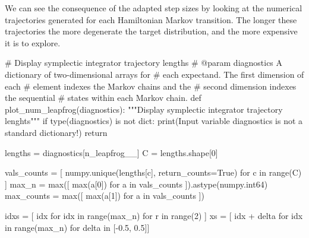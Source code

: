 \documentclass[
  letterpaper,
  DIV=11,
  numbers=noendperiod]{scrartcl}
\newenvironment{Shaded}{\begin{snugshade}}{\end{snugshade}}
\newcommand{\BuiltInTok}[1]{\textcolor[rgb]{0.00,0.23,0.31}{#1}}
\newcommand{\CommentTok}[1]{\textcolor[rgb]{0.37,0.37,0.37}{#1}}
\newcommand{\ControlFlowTok}[1]{\textcolor[rgb]{0.00,0.23,0.31}{#1}}
\newcommand{\DecValTok}[1]{\textcolor[rgb]{0.68,0.00,0.00}{#1}}
\newcommand{\FloatTok}[1]{\textcolor[rgb]{0.68,0.00,0.00}{#1}}
\newcommand{\KeywordTok}[1]{\textcolor[rgb]{0.00,0.23,0.31}{#1}}
\newcommand{\NormalTok}[1]{\textcolor[rgb]{0.00,0.23,0.31}{#1}}
\newcommand{\OperatorTok}[1]{\textcolor[rgb]{0.37,0.37,0.37}{#1}}
\newcommand{\StringTok}[1]{\textcolor[rgb]{0.13,0.47,0.30}{#1}}
\newcommand{\VariableTok}[1]{\textcolor[rgb]{0.07,0.07,0.07}{#1}}
\begin{document}
We can see the consequence of the adapted step sizes by looking at the
numerical trajectories generated for each Hamiltonian Markov transition.
The longer these trajectories the more degenerate the target
distribution, and the more expensive it is to explore.

\begin{Shaded}
\begin{Highlighting}[]
\CommentTok{\# Display symplectic integrator trajectory lengths}
\CommentTok{\# @param diagnostics A dictionary of two{-}dimensional arrays for }
\CommentTok{\#                    each expectand.  The first dimension of each}
\CommentTok{\#                    element indexes the Markov chains and the }
\CommentTok{\#                    second dimension indexes the sequential }
\CommentTok{\#                    states within each Markov chain.}
\KeywordTok{def}\NormalTok{ plot\_num\_leapfrog(diagnostics):}
  \CommentTok{"""Display symplectic integrator trajectory lenghts"""}
  \ControlFlowTok{if} \BuiltInTok{type}\NormalTok{(diagnostics) }\KeywordTok{is} \KeywordTok{not} \BuiltInTok{dict}\NormalTok{:}
    \BuiltInTok{print}\NormalTok{(}\StringTok{\textquotesingle{}Input variable \textasciigrave{}diagnostics\textasciigrave{} is not a standard dictionary!\textquotesingle{}}\NormalTok{)}
    \ControlFlowTok{return}
  
\NormalTok{  lengths }\OperatorTok{=}\NormalTok{ diagnostics[}\StringTok{\textquotesingle{}n\_leapfrog\_\_\textquotesingle{}}\NormalTok{]}
\NormalTok{  C }\OperatorTok{=}\NormalTok{ lengths.shape[}\DecValTok{0}\NormalTok{]}
  
\NormalTok{  vals\_counts }\OperatorTok{=}\NormalTok{ [ numpy.unique(lengths[c], return\_counts}\OperatorTok{=}\VariableTok{True}\NormalTok{) }
                  \ControlFlowTok{for}\NormalTok{ c }\KeywordTok{in} \BuiltInTok{range}\NormalTok{(C) ] }
\NormalTok{  max\_n }\OperatorTok{=} \BuiltInTok{max}\NormalTok{([ }\BuiltInTok{max}\NormalTok{(a[}\DecValTok{0}\NormalTok{]) }\ControlFlowTok{for}\NormalTok{ a }\KeywordTok{in}\NormalTok{ vals\_counts ]).astype(numpy.int64)}
\NormalTok{  max\_counts }\OperatorTok{=} \BuiltInTok{max}\NormalTok{([ }\BuiltInTok{max}\NormalTok{(a[}\DecValTok{1}\NormalTok{]) }\ControlFlowTok{for}\NormalTok{ a }\KeywordTok{in}\NormalTok{ vals\_counts ])}
  
\NormalTok{  idxs }\OperatorTok{=}\NormalTok{ [ idx }\ControlFlowTok{for}\NormalTok{ idx }\KeywordTok{in} \BuiltInTok{range}\NormalTok{(max\_n) }\ControlFlowTok{for}\NormalTok{ r }\KeywordTok{in} \BuiltInTok{range}\NormalTok{(}\DecValTok{2}\NormalTok{) ]}
\NormalTok{  xs }\OperatorTok{=}\NormalTok{ [ idx }\OperatorTok{+}\NormalTok{ delta }\ControlFlowTok{for}\NormalTok{ idx }\KeywordTok{in} \BuiltInTok{range}\NormalTok{(max\_n) }\ControlFlowTok{for}\NormalTok{ delta }\KeywordTok{in}\NormalTok{ [}\OperatorTok{{-}}\FloatTok{0.5}\NormalTok{, }\FloatTok{0.5}\NormalTok{]]}
  

\end{Highlighting}
\end{Shaded}
\end{document}

